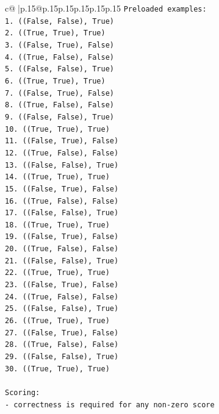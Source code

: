 \documentclass{article}
\begin{document}
{\begin{supertabular}{c@{$\;$}|p{.15\linewidth}@{}p{.15\linewidth}p{.15\linewidth}p{.15\linewidth}p{.15\linewidth}p{.15\linewidth}}
{{{\texttt{Preloaded examples:} \\
\texttt{1. ((False, False), True)} \\
\texttt{2. ((True, True), True)} \\
\texttt{3. ((False, True), False)} \\
\texttt{4. ((True, False), False)} \\
\texttt{5. ((False, False), True)} \\
\texttt{6. ((True, True), True)} \\
\texttt{7. ((False, True), False)} \\
\texttt{8. ((True, False), False)} \\
\texttt{9. ((False, False), True)} \\
\texttt{10. ((True, True), True)} \\
\texttt{11. ((False, True), False)} \\
\texttt{12. ((True, False), False)} \\
\texttt{13. ((False, False), True)} \\
\texttt{14. ((True, True), True)} \\
\texttt{15. ((False, True), False)} \\
\texttt{16. ((True, False), False)} \\
\texttt{17. ((False, False), True)} \\
\texttt{18. ((True, True), True)} \\
\texttt{19. ((False, True), False)} \\
\texttt{20. ((True, False), False)} \\
\texttt{21. ((False, False), True)} \\
\texttt{22. ((True, True), True)} \\
\texttt{23. ((False, True), False)} \\
\texttt{24. ((True, False), False)} \\
\texttt{25. ((False, False), True)} \\
\texttt{26. ((True, True), True)} \\
\texttt{27. ((False, True), False)} \\
\texttt{28. ((True, False), False)} \\
\texttt{29. ((False, False), True)} \\
\texttt{30. ((True, True), True)} \\
\\ 
\texttt{Scoring:} \\
\texttt{{-} correctness is required for any non{-}zero score} \\
}}}
\end{supertabular}}
\end{document}
